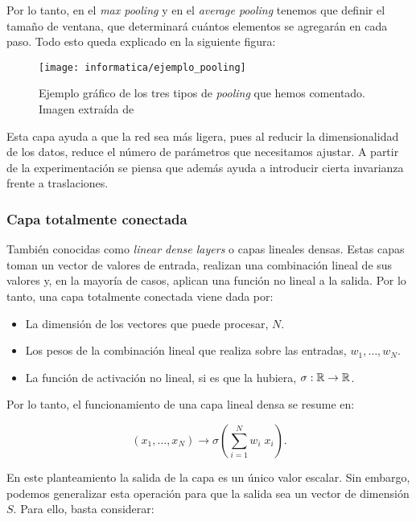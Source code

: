 Por lo tanto, en el \textit{max pooling} y en el \textit{average pooling} tenemos que definir el tamaño de ventana, que determinará cuántos elementos se agregarán en cada paso. Todo esto queda explicado en la siguiente figura:

\begin{figure}[H]
    \centering
    \texttt{[image: informatica/ejemplo\_pooling]}
    \caption{Ejemplo gráfico de los tres tipos de \textit{pooling} que hemos comentado. Imagen extraída de \cite{informatica:paper_definicion_cnn}}
\end{figure}

Esta capa ayuda a que la red sea más ligera, pues al reducir la dimensionalidad de los datos, reduce el número de parámetros que necesitamos ajustar. A partir de la experimentación se piensa que además ayuda a introducir cierta invarianza frente a traslaciones.

\subsubsection{Capa totalmente conectada} \label{subsubs:capa_totalmente_conectada}

También conocidas como \textit{linear dense layers} o capas lineales densas. Estas capas toman un vector de valores de entrada, realizan una combinación lineal de sus valores y, en la mayoría de casos, aplican una función no lineal a la salida. Por lo tanto, una capa totalmente conectada viene dada por:

\begin{itemize}
    \item La dimensión de los vectores que puede procesar, $N$.
    \item Los pesos de la combinación lineal que realiza sobre las entradas, $w_1, \ldots, w_N$.
    \item La función de activación no lineal, si es que la hubiera, $\sigma: \mathbb{R} \to \mathbb{R}$.
\end{itemize}

Por lo tanto, el funcionamiento de una capa lineal densa se resume en:

\begin{equation}
    (x_1, \ldots, x_N) \to \sigma(\sum_{i = 1}^{N} w_i \; x_i).
\end{equation}

En este planteamiento la salida de la capa es un único valor escalar. Sin embargo, podemos generalizar esta operación para que la salida sea un vector de dimensión $S$. Para ello, basta considerar:

